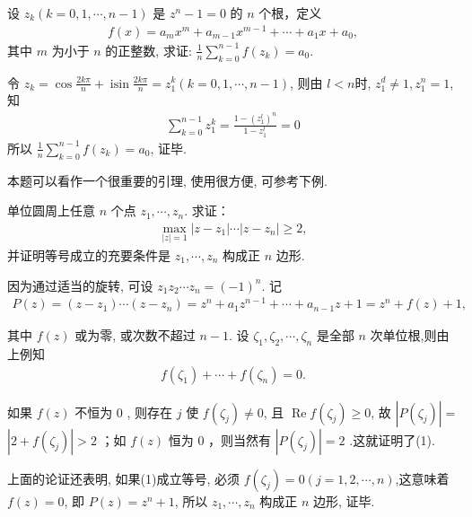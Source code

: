 \begin{example}
	设 $z_k(k=0,1, \cdots, n-1)$ 是 $z^n-1=0$ 的 $n$ 个根，定义
	\begin{align*}
		f(x)=a_m x^m+a_{m-1} x^{m-1}+\cdots+a_1 x+a_0,
	\end{align*}
	其中 $m$ 为小于 $n$ 的正整数, 求证: $\frac{1}{n} \sum_{k=0}^{n-1} f\left(z_k\right)=a_0$.
\end{example}
\begin{solution}
	令 $z_k=\cos \frac{2 k \pi}{n}+\operatorname{isin} \frac{2 k \pi}{n}=z_1^k(k=0,1, \cdots, n-1)$, 则由 $l<n$时, $z_1^d \neq 1, z_1^n=1$, 知
	\begin{align*}
		\sum_{k=0}^{n-1} z_1^k=\frac{1-\left(z_1^l\right)^n}{1-z_1^l}=0
	\end{align*}
	所以 $\frac{1}{n} \sum_{k=0}^{n-1} f\left(z_k\right)=a_0$, 证毕.
\end{solution}
\begin{note}
	本题可以看作一个很重要的引理, 使用很方便, 可参考下例.
\end{note}

\begin{example}
	单位圆周上任意 $n$ 个点 $z_1, \cdots, z_n$. 求证：
	\begin{align*}
		\max _{|z|=1}\left|z-z_1\right| \cdots\left|z-z_n\right| \geqslant 2,
	\end{align*}
	并证明等号成立的充要条件是 $z_1, \cdots, z_n$ 构成正 $n$ 边形.
\end{example}
\begin{solution}
	因为通过适当的旋转, 可设 $z_1 z_2 \cdots z_n=(-1)^n$. 记
	\begin{align*}
		P(z)=\left(z-z_1\right) \cdots\left(z-z_n\right)=z^n+a_1 z^{n-1}+\cdots+a_{n-1} z+1=z^n+f(z)+1,
	\end{align*}

	其中 $f(z)$ 或为零, 或次数不超过 $n-1$. 设 $\zeta_1, \zeta_2, \cdots, \zeta_n$ 是全部 $n$ 次单位根,则由上例知
	\begin{align*}
		f\left(\zeta_1\right)+\cdots+f\left(\zeta_n\right)=0 .
	\end{align*}

	如果 $f(z)$ 不恒为 0 , 则存在 $j$ 使 $f\left(\zeta_j\right) \neq 0$, 且 $\operatorname{Re} f\left(\zeta_j\right) \geqslant 0$, 故 $\left|P\left(\zeta_j\right)\right|=$ $\left|2+f\left(\zeta_j\right)\right|>2$ ；如 $f(z)$ 恒为 0 ，则当然有 $\left|P\left(\zeta_j\right)\right|=2$ .这就证明了(1).

	上面的论证还表明, 如果(1)成立等号, 必须 $f\left(\zeta_j\right)=0(j=1,2, \cdots, n)$,这意味着 $f(z)=0$, 即 $P(z)=z^n+1$, 所以 $z_1, \cdots, z_n$ 构成正 $n$ 边形, 证毕.
\end{solution}

